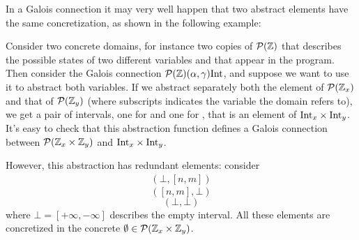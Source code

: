 %
%
%

In a Galois connection it may very well happen that two abstract elements have the same concretization, as shown in the following example:
\begin{example}
	Consider two concrete domains, for instance two copies of $\mathcal{P}(\mathbb{Z})$ that describes the possible states of two different variables  and  that appear in the program.
	Then consider the Galois connection $\mathcal{P}(\mathbb{Z}) (\alpha, \gamma) \text{Int}$, and suppose we want to use it to abstract both variables. If we abstract separately both the element of $\mathcal{P}(\mathbb{Z}_x)$ and that of $\mathcal{P}(\mathbb{Z}_y)$ (where subscripts indicates the variable the domain refers to), we get a pair of intervals, one for  and one for , that is an element of $\text{Int}_x \times \text{Int}_y$. It's easy to check that this abstraction function defines a Galois connection between $\mathcal{P}(\mathbb{Z}_x \times \mathbb{Z}_y)$ and $\text{Int}_x \times \text{Int}_y$.
	
	However, this abstraction has redundant elements: consider
	\begin{align*}
		(\bot, [n, m])
	\end{align*}
	\[ ([n, m], \bot) \]
	\[ (\bot, \bot) \]
	where $\bot = [+\infty, -\infty]$ describes the empty interval. All these elements are concretized in the concrete $\emptyset \in \mathcal{P}(\mathbb{Z}_x \times \mathbb{Z}_y)$.
\end{example}

